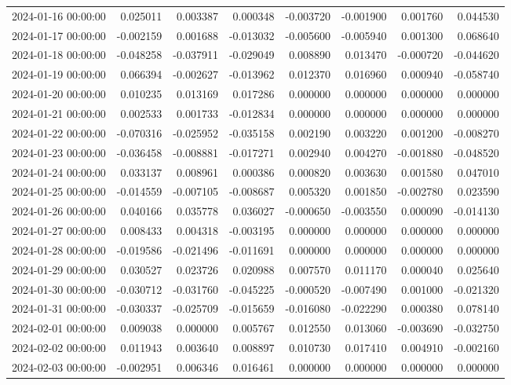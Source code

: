 \begin{tabular}{lrrrrrrr}
2024-01-16 00:00:00 & 0.025011 & 0.003387 & 0.000348 & -0.003720 & -0.001900 & 0.001760 & 0.044530 \\
2024-01-17 00:00:00 & -0.002159 & 0.001688 & -0.013032 & -0.005600 & -0.005940 & 0.001300 & 0.068640 \\
2024-01-18 00:00:00 & -0.048258 & -0.037911 & -0.029049 & 0.008890 & 0.013470 & -0.000720 & -0.044620 \\
2024-01-19 00:00:00 & 0.066394 & -0.002627 & -0.013962 & 0.012370 & 0.016960 & 0.000940 & -0.058740 \\
2024-01-20 00:00:00 & 0.010235 & 0.013169 & 0.017286 & 0.000000 & 0.000000 & 0.000000 & 0.000000 \\
2024-01-21 00:00:00 & 0.002533 & 0.001733 & -0.012834 & 0.000000 & 0.000000 & 0.000000 & 0.000000 \\
2024-01-22 00:00:00 & -0.070316 & -0.025952 & -0.035158 & 0.002190 & 0.003220 & 0.001200 & -0.008270 \\
2024-01-23 00:00:00 & -0.036458 & -0.008881 & -0.017271 & 0.002940 & 0.004270 & -0.001880 & -0.048520 \\
2024-01-24 00:00:00 & 0.033137 & 0.008961 & 0.000386 & 0.000820 & 0.003630 & 0.001580 & 0.047010 \\
2024-01-25 00:00:00 & -0.014559 & -0.007105 & -0.008687 & 0.005320 & 0.001850 & -0.002780 & 0.023590 \\
2024-01-26 00:00:00 & 0.040166 & 0.035778 & 0.036027 & -0.000650 & -0.003550 & 0.000090 & -0.014130 \\
2024-01-27 00:00:00 & 0.008433 & 0.004318 & -0.003195 & 0.000000 & 0.000000 & 0.000000 & 0.000000 \\
2024-01-28 00:00:00 & -0.019586 & -0.021496 & -0.011691 & 0.000000 & 0.000000 & 0.000000 & 0.000000 \\
2024-01-29 00:00:00 & 0.030527 & 0.023726 & 0.020988 & 0.007570 & 0.011170 & 0.000040 & 0.025640 \\
2024-01-30 00:00:00 & -0.030712 & -0.031760 & -0.045225 & -0.000520 & -0.007490 & 0.001000 & -0.021320 \\
2024-01-31 00:00:00 & -0.030337 & -0.025709 & -0.015659 & -0.016080 & -0.022290 & 0.000380 & 0.078140 \\
2024-02-01 00:00:00 & 0.009038 & 0.000000 & 0.005767 & 0.012550 & 0.013060 & -0.003690 & -0.032750 \\
2024-02-02 00:00:00 & 0.011943 & 0.003640 & 0.008897 & 0.010730 & 0.017410 & 0.004910 & -0.002160 \\
2024-02-03 00:00:00 & -0.002951 & 0.006346 & 0.016461 & 0.000000 & 0.000000 & 0.000000 & 0.000000 \\

\end{tabular}
